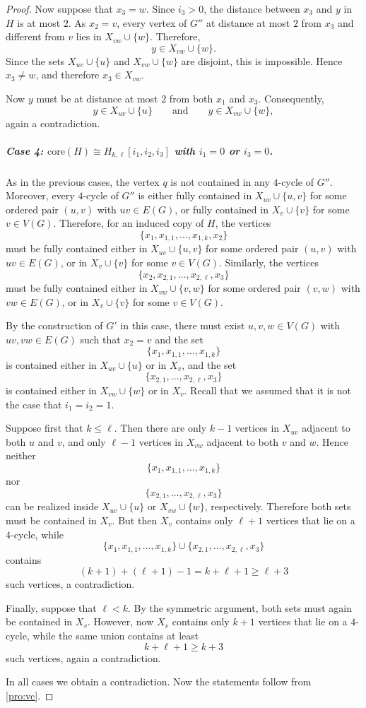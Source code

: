 \documentclass[a4paper,UKenglish,cleveref, autoref, thm-restate]{lipics-v2021}
\newcommand{\core}{\mathrm{core}}
\begin{document}
\begin{proof}
Now suppose that $x_3=w$.
Since $i_3>0$, the distance between $x_3$ and $y$ in $H$ is at most $2$.
As $x_2=v$, every vertex of $G''$ at distance at most $2$ from $x_3$ and different from $v$ lies in $X_{vw}\cup \{w\}$.
Therefore,
\[
y\in X_{vw}\cup \{w\}.
\]
Since the sets $X_{uv}\cup \{u\}$ and $X_{vw}\cup \{w\}$ are disjoint, this is impossible.
Hence $x_3\neq w$, and therefore $x_3\in X_{vw}$.

Now $y$ must be at distance at most $2$ from both $x_1$ and $x_3$.
Consequently,
\[
y\in X_{uv}\cup \{u\}
\qquad\text{and}\qquad
y\in X_{vw}\cup \{w\},
\]
again a contradiction.

\subparagraph*{Case 4: \boldmath $\core(H)\cong H_{k,\ell}[i_1,i_2,i_3]$ with $i_1=0$ or $i_3=0$.}
As in the previous cases, the vertex $q$ is not contained in any $4$-cycle of $G''$.
Moreover, every $4$-cycle of $G''$ is either fully contained in $X_{uv}\cup \{u,v\}$ for some ordered pair $(u,v)$ with $uv\in E(G)$, or fully contained in $X_v\cup \{v\}$ for some $v\in V(G)$.
Therefore, for an induced copy of $H$, the vertices
\[
\{x_1,x_{1,1},\ldots,x_{1,k},x_2\}
\]
must be fully contained either in $X_{uv}\cup \{u,v\}$ for some ordered pair $(u,v)$ with $uv\in E(G)$, or in $X_v\cup \{v\}$ for some $v\in V(G)$.
Similarly, the vertices
\[
\{x_2,x_{2,1},\ldots,x_{2,\ell},x_3\}
\]
must be fully contained either in $X_{vw}\cup \{v,w\}$ for some ordered pair $(v,w)$ with $vw\in E(G)$, or in $X_v\cup \{v\}$ for some $v\in V(G)$.

By the construction of $G'$ in this case, there must exist $u,v,w\in V(G)$ with $uv,vw\in E(G)$ such that $x_2=v$ and the set
\[
\{x_1,x_{1,1},\ldots,x_{1,k}\}
\]
is contained either in $X_{uv}\cup \{u\}$ or in $X_v$, and the set
\[
\{x_{2,1},\ldots,x_{2,\ell},x_3\}
\]
is contained either in $X_{vw}\cup \{w\}$ or in $X_v$.
Recall that we assumed that it is not the case that $i_1=i_2=1$.

Suppose first that $k\leq \ell$.
Then there are only $k-1$ vertices in $X_{uv}$ adjacent to both $u$ and $v$, and only $\ell-1$ vertices in $X_{vw}$ adjacent to both $v$ and $w$.
Hence neither
\[
\{x_1,x_{1,1},\ldots,x_{1,k}\}
\]
nor
\[
\{x_{2,1},\ldots,x_{2,\ell},x_3\}
\]
can be realized inside $X_{uv}\cup \{u\}$ or $X_{vw}\cup \{w\}$, respectively.
Therefore both sets must be contained in $X_v$.
But then $X_v$ contains only $\ell+1$ vertices that lie on a $4$-cycle, while
\[
\{x_1,x_{1,1},\ldots,x_{1,k}\}\cup \{x_{2,1},\ldots,x_{2,\ell},x_3\}
\]
contains
\[
(k+1)+(\ell+1)-1 = k+\ell+1 \geq \ell+3
\]
such vertices, a contradiction.

Finally, suppose that $\ell<k$.
By the symmetric argument, both sets must again be contained in $X_v$.
However, now $X_v$ contains only $k+1$ vertices that lie on a $4$-cycle, while the same union contains at least
\[
k+\ell+1 \geq k+3
\]
such vertices, again a contradiction.

In all cases we obtain a contradiction.
Now the statements follow from \cref{pro:vc}.
\end{proof}
\end{document}

